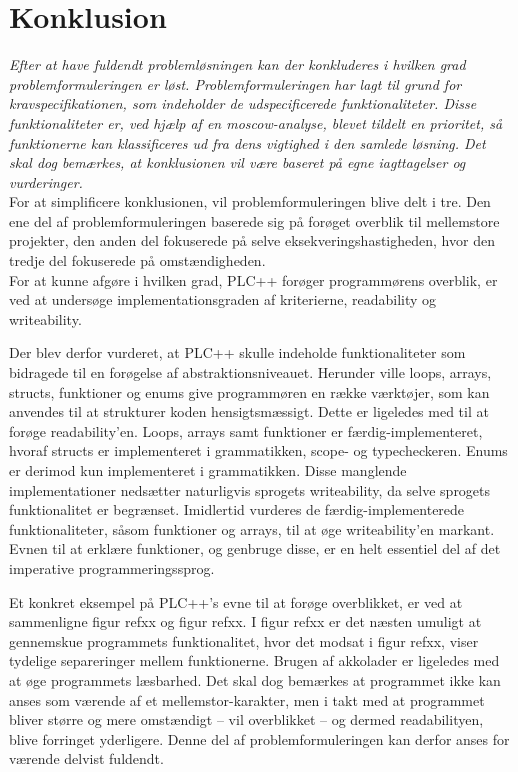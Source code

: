 \chapter{Konklusion}
\label{sec:konklusion}

\textit{Efter at have fuldendt problemløsningen kan der konkluderes i hvilken grad problemformuleringen er løst. Problemformuleringen har lagt til grund for kravspecifikationen, som indeholder de udspecificerede funktionaliteter. Disse funktionaliteter er, ved hjælp af en \gls{moscow}-analyse, blevet tildelt en prioritet, så funktionerne kan klassificeres ud fra dens vigtighed i den samlede løsning. Det skal dog bemærkes, at konklusionen vil være baseret på egne iagttagelser og vurderinger.} \\

\noindent For at simplificere konklusionen, vil problemformuleringen blive delt i tre. Den ene del af problemformuleringen baserede sig på forøget overblik til mellemstore projekter, den anden del fokuserede på selve eksekveringshastigheden, hvor den tredje del fokuserede på omstændigheden. \\

\noindent For at kunne afgøre i hvilken grad, PLC++ forøger programmørens overblik, er ved at undersøge implementationsgraden af kriterierne, readability og writeability.

Der blev derfor vurderet, at PLC++ skulle indeholde funktionaliteter som bidragede til en forøgelse af abstraktionsniveauet. Herunder ville loops, arrays, structs, funktioner og enums give programmøren en række værktøjer, som kan anvendes til at strukturer koden hensigtsmæssigt. Dette er ligeledes med til at forøge readability’en. Loops, arrays samt funktioner er færdig-implementeret, hvoraf structs er implementeret i grammatikken, scope- og typecheckeren. Enums er derimod kun implementeret i grammatikken. Disse manglende implementationer nedsætter naturligvis sprogets writeability, da selve sprogets funktionalitet er begrænset. Imidlertid vurderes de færdig-implementerede funktionaliteter, såsom funktioner og arrays, til at øge writeability’en markant. Evnen til at erklære funktioner, og genbruge disse, er en helt essentiel del af det imperative programmeringssprog. 

Et konkret eksempel på PLC++’s evne til at forøge overblikket, er ved at sammenligne figur refxx og figur refxx. I figur refxx er det næsten umuligt at gennemskue programmets funktionalitet, hvor det modsat i figur refxx, viser tydelige separeringer mellem funktionerne. Brugen af akkolader er ligeledes med at øge programmets læsbarhed. Det skal dog bemærkes at programmet ikke kan anses som værende af et mellemstor-karakter, men i takt med at programmet bliver større og mere omstændigt – vil overblikket – og dermed readabilityen, blive forringet yderligere. Denne del af problemformuleringen kan derfor anses for værende delvist fuldendt. \\

